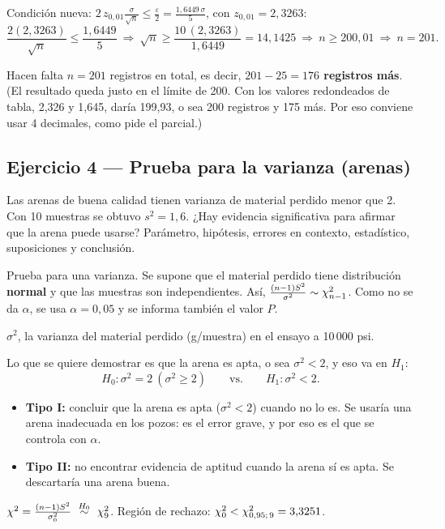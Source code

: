  Condición nueva: $2\,z_{0,01}\frac{\sigma}{\sqrt n}\le\frac{\varepsilon}{2}=\frac{1{,}6449\,\sigma}{5}$, con $z_{0,01}=2{,}3263$:
\[
\frac{2(2{,}3263)}{\sqrt n}\le\frac{1{,}6449}{5}\ \Rightarrow\ \sqrt n\ge\frac{10\,(2{,}3263)}{1{,}6449}=14{,}1425\ \Rightarrow\ n\ge200{,}01\ \Rightarrow\ n=201.
\]
\begin{resp}
Hacen falta $n=201$ registros en total, es decir, \textbf{$201-25=176$ registros más}.
(El resultado queda justo en el límite de 200. Con los valores redondeados de tabla, 2,326 y 1,645, daría 199,93, o sea 200 registros y 175 más. Por eso conviene usar 4 decimales, como pide el parcial.)
\end{resp}

\subsection{Ejercicio 4 --- Prueba para la varianza (arenas)}
\begin{enun}
Las arenas de buena calidad tienen varianza de material perdido menor que 2. Con 10 muestras se obtuvo $s^2=1{,}6$. ¿Hay evidencia significativa para afirmar que la arena puede usarse? Parámetro, hipótesis, errores en contexto, estadístico, suposiciones y conclusión.
\end{enun}
\begin{metodo}
Prueba para una varianza. Se supone que el material perdido tiene distribución \textbf{normal} y que las muestras son independientes. Así, $\frac{(n-1)S^2}{\sigma^2}\sim\chi^2_{n-1}$.
Como no se da $\alpha$, se usa $\alpha=0{,}05$ y se informa también el valor $P$.
\end{metodo}
 $\sigma^2$, la varianza del material perdido (g/muestra) en el ensayo a 10\,000 psi.

 Lo que se quiere demostrar es que la arena es apta, o sea $\sigma^2<2$, y eso va en $H_1$:
\[
H_0:\sigma^2=2\ (\sigma^2\ge2)\qquad\text{vs.}\qquad H_1:\sigma^2<2.
\]
\begin{itemize}
\item \textbf{Tipo I:} concluir que la arena es apta ($\sigma^2<2$) cuando no lo es. Se usaría una arena inadecuada en los pozos: es el error grave, y por eso es el que se controla con $\alpha$.
\item \textbf{Tipo II:} no encontrar evidencia de aptitud cuando la arena sí es apta. Se descartaría una arena buena.
\end{itemize}
 $\chis=\frac{(n-1)S^2}{\sigma_0^2}\ \overset{H_0}{\sim}\ \chis_{9}$. Región de rechazo: $\chi^2_0<\chi^2_{0,95;\,9}=3{,}3251$.

